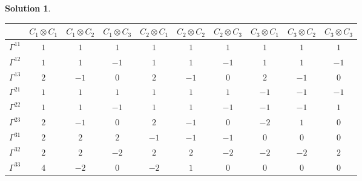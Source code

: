 \documentclass[UTF8,10pt,a4paper]{article}
\theoremstyle{Problem}
\theoremstyle{Solution}
\newtheorem*{sol}{Solution}
\begin{document}
\begin{sol}
\begin{table}[h]
\begin{tabular}{c|ccccccccc}
            & $C_1\otimes C_1$ & $C_1\otimes C_2$ & $C_1\otimes C_3$ & $C_2\otimes C_1$ & $C_2\otimes C_2$ & $C_2\otimes C_3$ & $C_3\otimes C_1$ & $C_3\otimes C_2$ & $C_3\otimes C_3$ \\ \hline
            $\Gamma^{11}$ & $1$ & $1$ & $1$ & $1$ & $1$ & $1$ & $1$ & $1$ & $1$ \\
            $\Gamma^{12}$ & $1$ & $1$ & $-1$ & $1$ & $1$ & $-1$ & $1$ & $1$ & $-1$ \\
            $\Gamma^{13}$ & $2$ & $-1$ & $0$ & $2$ & $-1$ & $0$ & $2$ & $-1$ & $0$ \\
            $\Gamma^{21}$ & $1$ & $1$ & $1$ & $1$ & $1$ & $1$ & $-1$ & $-1$ & $-1$ \\
            $\Gamma^{22}$ & $1$ & $1$ & $-1$ & $1$ & $1$ & $-1$ & $-1$ & $-1$ & $1$ \\
            $\Gamma^{23}$ & $2$ & $-1$ & $0$ & $2$ & $-1$ & $0$ & $-2$ & $1$ & $0$ \\
            $\Gamma^{31}$ & $2$ & $2$ & $2$ & $-1$ & $-1$ & $-1$ & $0$ & $0$ & $0$ \\
            $\Gamma^{32}$ & $2$ & $2$ & $-2$ & $2$ & $2$ & $-2$ & $-2$ & $-2$ & $2$ \\
            $\Gamma^{33}$ & $4$ & $-2$ & $0$ & $-2$ & $1$ & $0$ & $0$ & $0$ & $0$
        \end{tabular}
    \end{table}
\end{sol}
\end{document}
